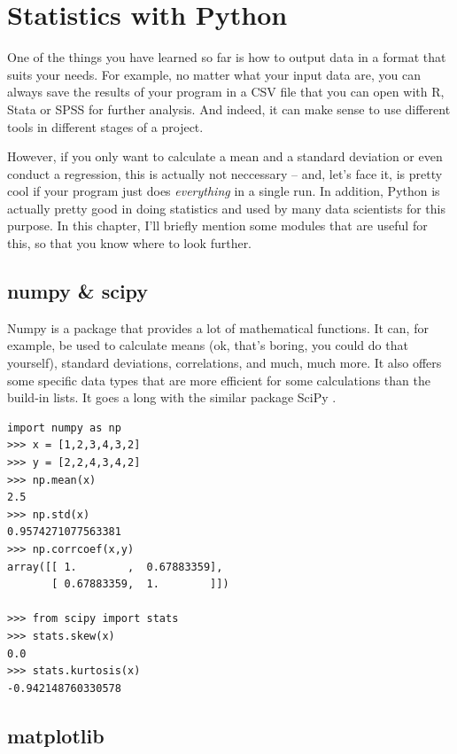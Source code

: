 \documentclass[a4paper,12pt]{book}
\begin{document}
\chapter{Statistics with Python}
\label{chap:statistics}
One of the things you have learned so far is how to output data in a format that suits your needs. For example, no matter what your input data are, you can always save the results of your program in a CSV file that you can open with R, Stata or SPSS for further analysis. And indeed, it can make sense to use different tools in different stages of a project.

However, if you only want to calculate a mean and a standard deviation or even conduct a regression, this is actually not neccessary -- and, let's face it, is pretty cool if your program just does \emph{everything} in a single run. In addition, Python is actually pretty good in doing statistics and used by many data scientists for this purpose. In this chapter, I'll briefly mention some modules that are useful for this, so that you know where to look further.


\section{numpy \& scipy}
Numpy \citep{numpy} is a package that provides a lot of mathematical functions. It can, for example, be used to calculate means (ok, that's boring, you could do that yourself), standard deviations, correlations, and much, much more. It also offers some specific data types that are more efficient for some calculations than the build-in lists. It goes a long with the similar package SciPy \citep{scipy}.



\begin{lstlisting}
import numpy as np
>>> x = [1,2,3,4,3,2]
>>> y = [2,2,4,3,4,2]
>>> np.mean(x)
2.5
>>> np.std(x)
0.9574271077563381
>>> np.corrcoef(x,y)
array([[ 1.        ,  0.67883359],
       [ 0.67883359,  1.        ]])

>>> from scipy import stats
>>> stats.skew(x)
0.0
>>> stats.kurtosis(x)
-0.942148760330578
\end{lstlisting}




\section{matplotlib}
\end{document}
